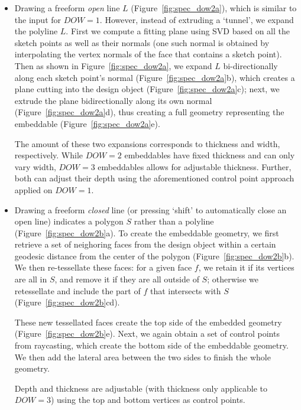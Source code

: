 \begin{itemize}
	\item Drawing a freeform \textit{open} line $L$ (Figure~\ref{fig:spec_dow2a}), which is similar to the input for $DOW=1$. However, instead of extruding a `tunnel', we expand the polyline $L$. First we compute a fitting plane using SVD based on all the sketch points as well as their normals (one such normal is obtained by interpolating the vertex normals of the face that contains a sketch point). Then as shown in Figure~\ref{fig:spec_dow2a}, we expand $L$ bi-directionally along each sketch point's normal (Figure~\ref{fig:spec_dow2a}b), which creates a plane cutting into the design object (Figure~\ref{fig:spec_dow2a}c); next, we extrude the plane bidirectionally along its own normal (Figure~\ref{fig:spec_dow2a}d), thus creating a full geometry representing the embeddable (Figure~\ref{fig:spec_dow2a}e).

	The amount of these two expansions corresponds to thickness and width, respectively. While $DOW=2$ embeddables have fixed thickness and can only vary width, $DOW=3$ embeddables allows for adjustable thickness. Further, both can adjust their depth using the aforementioned control point approach applied on $DOW=1$.
	
	\item Drawing a freeform \textit{closed} line (or pressing `shift' to automatically close an open line) indicates a polygon $S$ rather than a polyline (Figure~\ref{fig:spec_dow2b}a). To create the embeddable geometry, we first retrieve a set of neighoring faces from the design object within a certain geodesic distance from the center of the polygon (Figure~\ref{fig:spec_dow2b}b). We then re-tessellate these faces: for a given face $f$, we retain it if its vertices are all in $S$, and remove it if they are all outside of $S$; otherwise we retessellate and include the part of $f$ that intersects with $S$ (Figure~\ref{fig:spec_dow2b}cd).

	These new tessellated faces create the top side of the embedded geometry (Figure~\ref{fig:spec_dow2b}e). Next, we again obtain a set of control points from raycasting, which create the bottom side of the embeddable geometry. We then add the lateral area between the two sides to finish the whole geometry.

	Depth and thickness are adjustable (with thickness only applicable to $DOW=3$) using the top and bottom vertices as control points.
\end{itemize}

